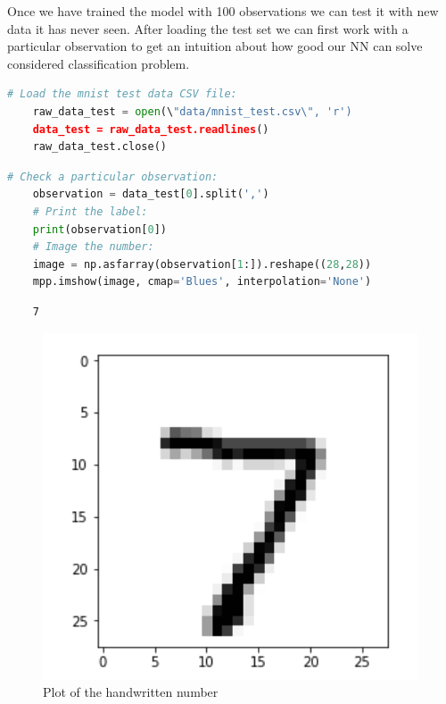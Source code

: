 Once we have trained the model with 100 observations we can test it with new data it has never seen. After loading the test set we can first work with a particular observation to get an intuition about how good our NN can solve considered classification problem.

\begin{lstlisting}[language=Python]
    # Load the mnist test data CSV file:
    raw_data_test = open(\"data/mnist_test.csv\", 'r')
    data_test = raw_data_test.readlines()
    raw_data_test.close()
\end{lstlisting}

\begin{lstlisting}[language=Python]
    # Check a particular observation:
    observation = data_test[0].split(',')
    # Print the label:
    print(observation[0])
    # Image the number:
    image = np.asfarray(observation[1:]).reshape((28,28))
    mpp.imshow(image, cmap='Blues', interpolation='None')
\end{lstlisting}

\begin{lstlisting}
    7
\end{lstlisting}

\begin{figure}[H]
   \includegraphics[width=\linewidth]{pics/7.png}
   \caption{\label{fig:number7} Plot of the handwritten number}
\end{figure}

